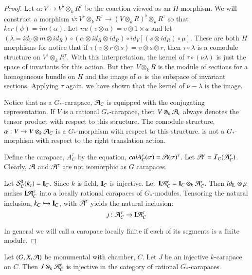 \begin{proof}
Let $\alpha : V \rightarrow V^{\flat} \otimes_{k}R^{r}$ be the coaction viewed as an $H$-morphism. We will construct a morphism $\psi : V^{\flat} \otimes_{k}R^{\tau} \rightarrow (V \otimes_{k} R)^{\flat} \otimes_{k}R^{\tau}$ so that $ker(\psi) = im(\alpha)$. Let $nu(v \otimes a) = v \otimes 1 \times a $ and let $(\lambda = id_{V} \otimes m \otimes id_{R})\circ (\alpha \otimes id_{R} \otimes id_{R}) \circ id_{V}[(s \otimes id_{R}) \circ \mu]$. These are both $H$ morphisms for notice that if $\tau(v \otimes r \otimes s) = v \otimes s \otimes r$, then $\tau \circ \lambda$ is a comodule structure on $V^{\flat} \otimes_{k} R^{\tau}$. With this interpretation, the kernel of $\tau \circ (\nu \lambda)$ is just the space of invariants for this action. But then $V \otimes_{k} R$ is the module of sections for a homogeneous bundle on $H$ and the image of $\alpha$ is the subspace of invariant sections. Applying $\tau$ again. we have shown that the kernel of $\nu-\lambda$ is the image.

Notice that as a $G_{*}$-carapace, $\mathcal{A}_{C}$ is equipped with  the conjugating representation. If $V$ is a rational $G_{*}$-carapace, then $V \otimes_{k} \mathcal{A}_{c}$ always denotes the tensor product with respect to this structure. The comodule structure, $\alpha : V\rightarrow V \otimes_{k} \mathcal{A}_{C}$ is a $G_{*}$-morphism with respect to this structure. is not a $G_{*}$-morphism with respect to the right translation action.

Define the carapace, $A_{C}^{\tau}$ by the equation, $calA_{C}^{r}(\sigma) = \mathcal{A}(\sigma)^{\tau}$. Let $\mathcal{A}^{r} = \mathcal{I}_{C}(\mathcal{A}_{C}^{r})$.  Clearly, $\mathcal{A}$ and $\mathcal{A}^{\tau}$ are not isomorphic as  $G$ carapaces.

Let $\mathcal{S}_{C}^{0}(k_{c}) = \mathbf{I}_{C}$. Since $k$ is field, $\mathbf{I}_{C}$ is injective. Let $\mathbf{I}\mathcal{A}_{C}^{r}= \mathbf{I}_{C}\otimes_{k}\mathcal{A}_{C}^{r}$. Then $id_{\mathbf{I}_{c}} \otimes \mu$ makes $\mathbf{I}\mathcal{A}_{C}^{\tau}$ into a locally rational carapaces of $G_{*}$-modules. Tensoring the natural inclusion, $k_{C}\hookrightarrow \mathbf{I}_{C}$, with $\mathcal{A}^{\tau}$ yields the natural inclusion:
$$
\jmath: \mathcal{A}_{C}^{\tau} \rightarrow \mathbf{I}\mathcal{A}_{C}^{\tau}
$$

In general we will call a carapace locally finite if each of its segments is a finite module.
\end{proof}

\begin{prop}\label{art6-prop-14.3}
Let $(G, X, \mathcal{A})$ be monumental with chamber, $C$. Let $J$ be an injective $k$-carapace on $C$. Then $J\otimes_{k} \mathcal{A}_{C}^{r}$ is injective in the category of rational $G_{*}$-carapaces.
\end{prop}

